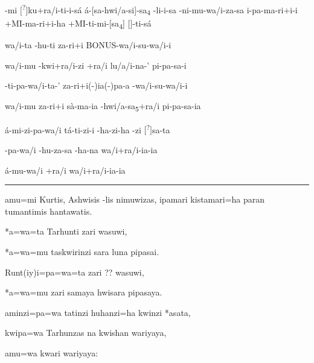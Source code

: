 \setcounter{parcount}{0}
\begin{parnumbersa}[]

	\raggedright%
	\itshape%

	-mi
	$[$\lmasc\textsuperscript{?}$]$ku+ra/i-ti-i-sá
	\lmasc{}á-[sa-hwi/a-si]-sa\textsubscript{4}
	\lmasc{}-li-i-sa
	\lmasc{}-ni-mu-wa/i-za-sa
	i-pa-ma-ri+i-i
	\lmasc{}+MI-ma-ri+i-ha
	\lmasc{}
	\lmasc{}+MI-ti-mi-[sa\textsubscript{4}]
	\lbreak{} $[$\lmasc$]$-ti-sá


	\lmasc{}wa/i-ta
	\lmasc{}-hu-ti
	\lmasc{}za-ri+i
	\lmasc{}BONUS-wa/i-su-wa/i-i


	\lmasc{}wa/i-mu
	\lmasc{}-kwi+ra/i-zi
	\lmasc{}+ra/i
	\lmasc{}lu/a/i-na-'
	\lmasc{}pi-pa-sa-i


	\lmasc{}-ti-pa-wa/i-ta-'
	\lmasc{}za-ri+i{(-)}ia{(-)}pa-a
	\lmasc{}-wa/i-su-wa/i-i


	\lmasc{}wa/i-mu
	\lmasc{}za-ri+i
	\lmasc{}sà-ma-ia
	\lbreak{}\lmasc{}-hwi/a-sa\textsubscript{5}+ra/i
	\lmasc{}pi-pa-sa-ia


	\lmasc{}á-mi-zi-pa-wa/i
	\lmasc{}tá-ti-zi-i
	\lmasc{}-ha-zi-ha
	\lmasc{}-zi
	$[$\lmasc\textsuperscript{?}$]$sa-ta


	\lmasc{}-pa-wa/i -hu-za-sa
	\lmasc{}
	\lmasc{}-ha-na
	\lmasc{}wa/i+ra/i-ia-ia


	\lmasc{}á-mu-wa/i
	\lmasc{}+ra/i
	\lmasc{}wa/i+ra/i-ia-ia



\end{parnumbersa}

\vspace{10pt}
\hrule
\vspace{10pt}


\setcounter{parcount}{0}
\begin{parnumbersa}[]

	\raggedright%
	\itshape%

	amu=mi Kurtis, Ashwisis -lis nimuwizas,
	ipamari kistamari=ha paran tumantimis hantawatis.

	*a=wa=ta Tarhunti zari wasuwi,

	*a=wa=mu taskwirinzi sara luna pipasai.

	Runt{(iy)}i=pa=wa=ta zari {??} wasuwi,

	*a=wa=mu zari samaya hwisara pipasaya.

	aminzi=pa=wa tatinzi huhanzi=ha kwinzi *asata,

	kwipa=wa Tarhunzas na kwishan wariyaya,

	amu=wa kwari wariyaya:


\end{parnumbersa}

